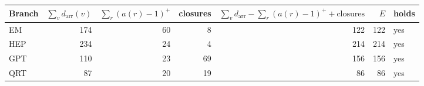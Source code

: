\begin{tabular}{@{}lrrrrrl@{}}\toprule
Branch & $\sum_v d_{\mathrm{arr}}(v)$ & $\sum_r (a(r)-1)^+$ & closures & $\sum_v d_{\mathrm{arr}} - \sum_r (a(r)-1)^+ + \text{closures}$ & $E$ & holds \\\midrule
EM & 174 & 60 & 8 & 122 & 122 & yes \\
HEP & 234 & 24 & 4 & 214 & 214 & yes \\
GPT & 110 & 23 & 69 & 156 & 156 & yes \\
QRT & 87 & 20 & 19 & 86 & 86 & yes \\
\bottomrule\end{tabular}
